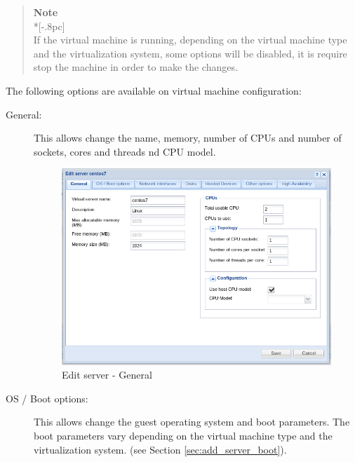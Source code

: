     \begin{quote}
        {\large \bf Note} \\*[-.8pc]
        \underline{\hspace{6in}} \\
        If the virtual machine is running, depending on the virtual machine type and the virtualization system, some options will be disabled, it is require stop the machine in order to make the changes.
    \end{quote}

The following options are available on virtual machine configuration:
\begin{description}
	\item[General:] This allows change the name, memory, number of CPUs and number of sockets, cores and threads nd CPU model.

		\begin{figure}[H]
        		\begin{center}
		        \includegraphics[scale=0.5]{screenshots/server_edit_general.png}
        		\caption{Edit server - General}
	        	\label{fig:server_edit_general}
	        	\end{center}
		\end{figure}

	\item[OS / Boot options:] This allows change the guest operating system and boot parameters.
            The boot parameters vary depending on the virtual machine type and the virtualization system. (see Section \ref{sec:add_server_boot}).


\end{description}
